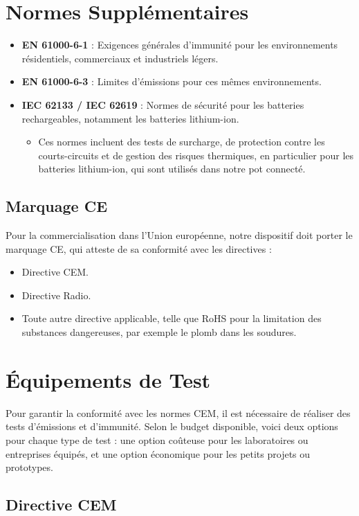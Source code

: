 \documentclass[a4paper,12pt]{article}
\begin{document}
\section{Normes Supplémentaires}
\begin{itemize}
    \item \textbf{EN 61000-6-1} : Exigences générales d'immunité pour les environnements résidentiels, commerciaux et industriels légers.
    \item \textbf{EN 61000-6-3} : Limites d'émissions pour ces mêmes environnements.
    \item \textbf{IEC 62133 / IEC 62619} : Normes de sécurité pour les batteries rechargeables, notamment les batteries lithium-ion.
          \begin{itemize}
              \item Ces normes incluent des tests de surcharge, de protection contre les courts-circuits et de gestion des risques thermiques, en particulier pour les batteries lithium-ion, qui sont utilisés dans notre pot connecté.
          \end{itemize}
\end{itemize}
\subsection{Marquage CE}
Pour la commercialisation dans l'Union européenne, notre dispositif doit porter le marquage CE, qui atteste de sa conformité avec les directives :
\begin{itemize}
    \item Directive CEM.
    \item Directive Radio.
    \item Toute autre directive applicable, telle que RoHS pour la limitation des substances dangereuses, par exemple le plomb dans les soudures.
\end{itemize}

\newpage

\section{Équipements de Test}
Pour garantir la conformité avec les normes CEM, il est nécessaire de réaliser des tests d’émissions et d’immunité. Selon le budget disponible, voici deux options pour chaque type de test : une option coûteuse pour les laboratoires ou entreprises équipés, et une option économique pour les petits projets ou prototypes.

\subsection{Directive CEM}
\end{document}

